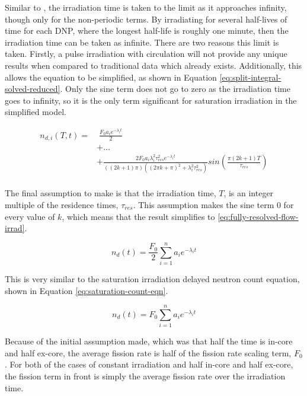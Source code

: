 Similar to \cite{wilson2002delayed}, the irradiation time is taken to the limit as it approaches infinity, though only for the non-periodic terms.
By irradiating for several half-lives of time for each \gls{DNP}, where the longest half-life is roughly one minute, then the irradiation time can be taken as infinite. 
There are two reasons this limit is taken.
Firstly, a pulse irradiation with circulation will not provide any unique results when compared to traditional data which already exists.
Additionally, this allows the equation to be simplified, as shown in Equation \eqref{eq:split-integral-solved-reduced}.
Only the sine term does not go to zero as the irradiation time goes to infinity, so it is the only term significant for saturation irradiation in the simplified model.


\begin{equation}
\begin{split}
    n_{d, i}(T, t) =& \; \frac{F_0 a_i e^{-\lambda_i t}}{2}\\
    & + \dots\\
    & + \frac{2 F_0 a_i \lambda_i^2 \tau_{res}^2 e^{-\lambda_i t} }{\left( (2k+1) \pi \right) \left( (2 \pi k + \pi)^2 + \lambda_i^2 \tau_{res}^2 \right)} sin\left( \frac{\pi (2k+1) T}{\tau_{res}} \right)\\
    \label{eq:split-integral-solved-reduced}
\end{split}
\end{equation}

The final assumption to make is that the irradiation time, $T$, is an integer multiple of the residence times, $\tau_{res}$.
This assumption makes the sine term 0 for every value of $k$, which means that the result simplifies to \eqref{eq:fully-resolved-flow-irrad}.



\begin{equation}
    n_{d}(t) = \frac{F_0}{2} \sum_{i=1}^{n} a_i e^{-\lambda_i t}
    \label{eq:fully-resolved-flow-irrad}
\end{equation}

This is very similar to the saturation irradiation delayed neutron count equation, shown in Equation \eqref{eq:saturation-count-eqn}.

\begin{equation}
    n_{d}(t) = F_0 \sum_{i=1}^{n} a_i e^{-\lambda_i t}
    \label{eq:saturation-count-eqn}
\end{equation}

Because of the initial assumption made, which was that half the time is in-core and half ex-core, the average fission rate is half of the fission rate scaling term, $F_0$.
For both of the cases of constant irradiation and half in-core and half ex-core, the fission term in front is simply the average fission rate over the irradiation time.

